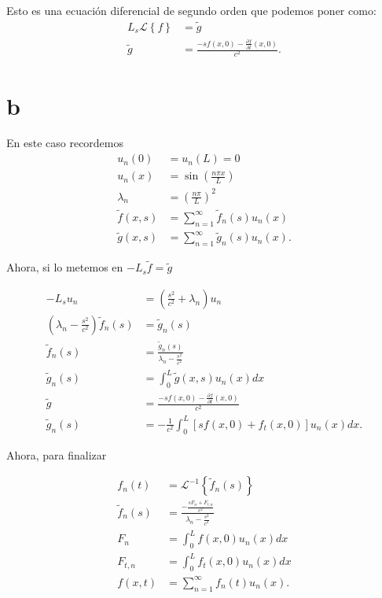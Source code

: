 \documentclass{report}
\newcommand{\Lagr}{\mathcal{L}}
\begin{document}
Esto es una ecuación diferencial de segundo orden que podemos poner como:
\begin{align*}
  L_s \Lagr\left\{ f \right\} &= \tilde{g} \\
  \tilde{g} &= \frac{-sf\left( x, 0 \right) - \frac{\partial f}{\partial t} \left( x, 0 \right)}{c^2} 
.\end{align*}

\section{b}

En este caso recordemos
\begin{align*}
  u_n\left( 0 \right) &= u_n\left( L \right) = 0 \\
  u_n\left( x \right) &= \sin\left( \frac{n \pi x}{L} \right)  \\
  \lambda_n &= \left( \frac{n\pi}{L} \right)^2\\
  \tilde{f}\left( x, s \right) &= \sum_{n=1}^{\infty} \tilde{f}_n\left( s \right) u_n\left( x \right)  \\
  \tilde{g}\left( x, s \right) &= \sum_{n=1}^{\infty} \tilde{g}_n\left( s \right) u_n\left( x \right)
.\end{align*}

Ahora, si lo metemos en $-L_s\tilde{f} = \tilde{g}$

 \begin{align*}
  -L_s u_n &= \left( \frac{s^2}{c^2} + \lambda_n \right) u_n \\
  \left( \lambda_n - \frac{s^2}{c^2} \right) \tilde{f}_n\left( s \right) &= \tilde{g}_n\left( s \right)  \\
  \tilde{f}_n\left( s \right) &= \frac{\tilde{g}_n\left( s \right) }{\lambda_n - \frac{s^2}{c^2}} \\
  \tilde{g}_n\left( s \right) &= \int_{0}^{L}\tilde{g}\left( x, s \right) u_n\left( x \right) dx \\
  \tilde{g} &= \frac{-sf\left( x, 0 \right) - \frac{\partial f}{\partial t} \left( x, 0 \right)}{c^2}\\ 
  \tilde{g}_n\left( s \right) &= -\frac{1}{c^2}\int_{0}^{L}\left[ sf\left( x, 0 \right) + f_t\left( x, 0 \right)  \right] u_n\left( x \right) dx
.\end{align*}

Ahora, para finalizar

\begin{align*}
  f_n\left( t \right) &= \Lagr^{-1}\left\{ \tilde{f}_n\left( s \right)  \right\}  \\
  \tilde{f}_n\left( s \right) &= \frac{- \frac{sF_n + F_{t, n}}{c^2}}{\lambda_n - \frac{s^2}{c^2}} \\
  F_n &= \int_{0}^{L}f\left( x, 0 \right) u_n\left( x \right) dx \\
  F_{t, n}&= \int_{0}^{L}f_t\left( x, 0 \right) u_n\left( x \right) dx \\
  f\left( x, t \right) &= \sum_{n=1}^{\infty} f_n\left( t \right) u_n\left( x \right)
.\end{align*}
\end{document}
